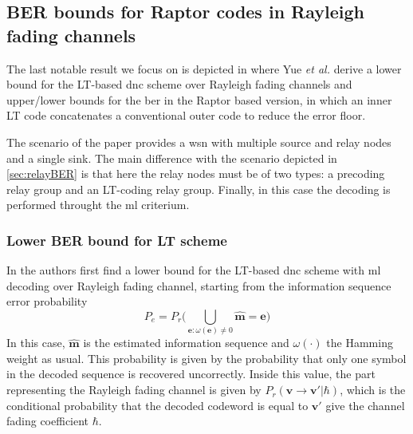 \subsection{BER bounds for Raptor codes in Rayleigh fading channels}
The last notable result we focus on is depicted in \cite{Yue2013} where Yue \textit{et al.} derive a lower bound for the LT-based \gls{dnc} scheme over Rayleigh fading channels and upper/lower bounds for the \gls{ber} in the Raptor based version, in which an inner LT code concatenates a conventional outer code to reduce the error floor.

The scenario of the paper provides a \gls{wsn} with multiple source and relay nodes and a single sink. The main difference with the scenario depicted in \autoref{sec:relayBER} is that here the relay nodes must be of two types: a precoding relay group and an LT-coding relay group. Finally, in this case the decoding is performed throught the \gls{ml} criterium.

\subsubsection{Lower BER bound for LT scheme}
In \cite{Yue2013} the authors first find a lower bound for the LT-based \gls{dnc} scheme with \gls{ml} decoding over Rayleigh fading channel, starting from the information sequence error probability
\begin{equation}
  P_e = P_r\biggl(\bigcup\limits_{\mathbf{e}:\omega(\mathbf{e})\neq 0}\hat{\mathbf{m} }= \mathbf{e}\biggr)
\end{equation}
In this case, $\hat{\mathbf{m}}$ is the estimated information sequence and $\omega(\cdot)$ the Hamming weight as usual. This probability is given by the probability that only one symbol in the decoded sequence is recovered uncorrectly. Inside this value, the part representing the Rayleigh fading channel is given by $P_r(\mathbf{v}\rightarrow \mathbf{v}'|\hbar)$, which is the conditional probability that the decoded codeword is equal to $\mathbf{v}'$ give the channel fading coefficient $\hbar$.

